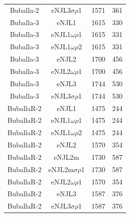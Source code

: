 \documentclass[prc, reprint, amsmath, floatfix,10pt]{revtex4-1}
\begin{document}
\begin{table}[!htpb]
\begin{ruledtabular}
\begin{tabular}{cccc}
Buballa-2 & eNJL3$\sigma\rho$1 & 1571 & 361 \\
Buballa-3 & eNJL1 & 1615 & 330\\
Buballa-3 & eNJL1$\omega\rho$1 & 1615 & 331 \\
Buballa-3 & eNJL1$\omega\rho$2 & 1615 & 331 \\
Buballa-3 & eNJL2 & 1700 & 456 \\
Buballa-3 & eNJL2$\omega\rho$1 & 1700 & 456 \\
Buballa-3 & eNJL3 & 1744 & 530\\
Buballa-3 & eNJL3$\sigma\rho$1 & 1744 & 530 \\
BuballaR-2 & eNJL1 & 1475 & 244 \\
BuballaR-2 & eNJL1$\omega\rho$1 & 1475 & 244 \\
BuballaR-2 & eNJL1$\omega\rho$2 & 1475 & 244 \\
BuballaR-2 & eNJL2 & 1570 & 354 \\
BuballaR-2 & eNJL2m & 1730 & 587\\
BuballaR-2 & eNJL2m$\sigma\rho$1 & 1730 & 587 \\
BuballaR-2 & eNJL2$\omega\rho$1 & 1570 & 354 \\
BuballaR-2 & eNJL3 & 1587 & 376 \\
BuballaR-2 & eNJL3$\sigma\rho$1 & 1587 & 376 \\
\end{tabular}
\end{ruledtabular}
\end{table}
\end{document}
